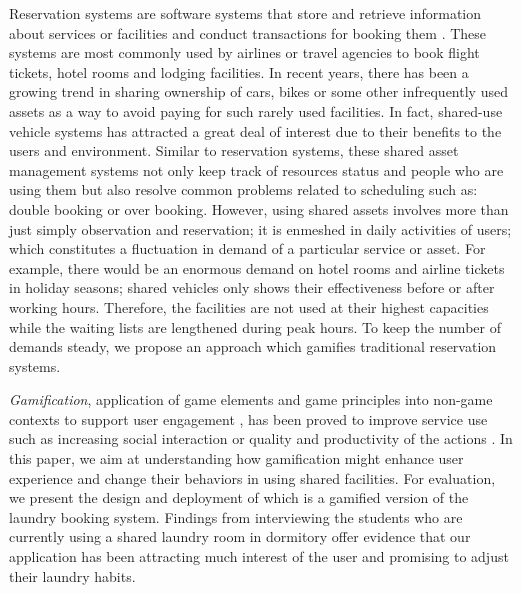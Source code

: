 Reservation systems are software systems that store and retrieve information about services or facilities and conduct transactions for booking them \cite{wiki:CRS}. These systems are most commonly used by airlines or travel agencies to book flight tickets, hotel rooms and lodging facilities. In recent years, there has been a growing trend in sharing ownership of cars, bikes or some other infrequently used assets as a way to avoid paying for such rarely used facilities. In fact, shared-use vehicle systems \cite{barth2002shared, nextbike} has attracted a great deal of interest due to their benefits to the users and environment. Similar to reservation systems, these shared asset management systems not only keep track of resources status and people who are using them but also resolve common problems related to scheduling such as: double booking or over booking. However, using shared assets involves more than just simply observation and reservation; it is enmeshed in daily activities of users; which constitutes a fluctuation in demand of a particular service or asset. For example, there would be an enormous demand on hotel rooms and airline tickets in holiday seasons; shared vehicles only shows their effectiveness before or after working hours. Therefore, the facilities are not used at their highest capacities while the waiting lists are lengthened during peak hours. To keep the number of demands steady, we propose an approach which gamifies traditional reservation systems.

\emph{Gamification}, application of game elements and game principles into non-game contexts to support user engagement \cite{deterding2011game, hamari2014does}, has been proved to improve service use such as increasing social interaction or quality and productivity of the actions \cite{hamari2014does}. In this paper, we aim at understanding how gamification might enhance user experience and change their behaviors in using shared facilities. For evaluation, we present the design and deployment of {\toolname} which is a gamified version of the laundry booking system. Findings from interviewing the students who are currently using a shared laundry room in dormitory offer evidence that our application has been attracting much interest of the user and promising to adjust their laundry habits.